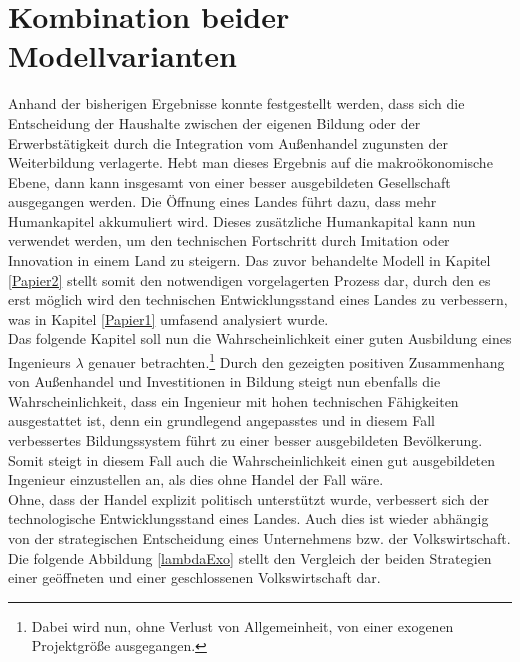 \chapter{Kombination beider Modellvarianten}\label{Kombi}
Anhand der bisherigen Ergebnisse konnte festgestellt werden, dass sich die Entscheidung
der Haushalte zwischen der eigenen Bildung oder der Erwerbstätigkeit durch die Integration vom Außenhandel zugunsten der Weiterbildung verlagerte. Hebt man dieses Ergebnis auf die makroökonomische Ebene, dann kann insgesamt von einer besser ausgebildeten Gesellschaft ausgegangen werden. Die Öffnung eines Landes führt dazu, dass mehr Humankapitel akkumuliert wird. Dieses zusätzliche Humankapital kann nun verwendet werden, um den technischen Fortschritt durch Imitation oder Innovation in einem Land zu steigern. Das zuvor behandelte Modell in Kapitel \ref{Papier2} stellt somit den notwendigen vorgelagerten Prozess dar, durch den es erst möglich wird den technischen Entwicklungsstand eines Landes zu verbessern, was in Kapitel \ref{Papier1} umfasend analysiert wurde.\\
%
Das folgende Kapitel soll nun die Wahrscheinlichkeit einer guten Ausbildung eines Ingenieurs $\lambda$ genauer betrachten.\footnote{Dabei wird nun, ohne Verlust von Allgemeinheit, von einer exogenen Projektgröße ausgegangen.} Durch den gezeigten positiven Zusammenhang von Außenhandel und Investitionen in Bildung steigt nun ebenfalls die Wahrscheinlichkeit, dass ein Ingenieur mit hohen technischen Fähigkeiten ausgestattet ist, denn ein grundlegend angepasstes und in diesem Fall verbessertes Bildungssystem führt zu einer besser ausgebildeten Bevölkerung. Somit steigt in diesem Fall auch die Wahrscheinlichkeit einen gut ausgebildeten Ingenieur einzustellen an, als dies ohne Handel der Fall wäre.  \\
Ohne, dass der Handel explizit politisch unterstützt wurde, verbessert sich der technologische Entwicklungsstand eines Landes. Auch dies ist wieder abhängig von der strategischen Entscheidung eines Unternehmens bzw. der Volkswirtschaft. Die folgende Abbildung \ref{lambdaExo} stellt den Vergleich der beiden Strategien einer geöffneten und einer geschlossenen Volkswirtschaft dar.\\
%
